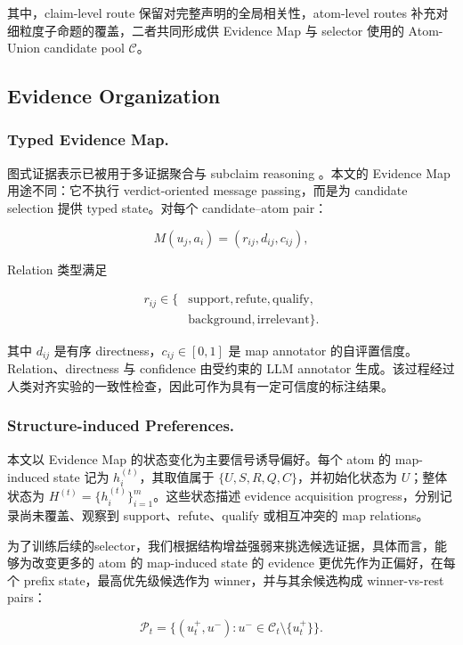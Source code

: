 \documentclass[letterpaper]{article}
\begin{document}
其中，claim-level route 保留对完整声明的全局相关性，atom-level routes 补充对细粒度子命题的覆盖，二者共同形成供 Evidence Map 与 selector 使用的 Atom-Union candidate pool $\mathcal C$。

\subsection{Evidence Organization}

\subsubsection{Typed Evidence Map.}

图式证据表示已被用于多证据聚合与 subclaim reasoning \citep{Zhou2019GEAR,Liu2019KGAT,Wang2026GDefense,Lourenco2026KGCRAFT}。本文的 Evidence Map 用途不同：它不执行 verdict-oriented message passing，而是为 candidate selection 提供 typed state。对每个 candidate--atom pair：

\[
M(u_j,a_i)=(r_{ij},d_{ij},c_{ij}),
\]

Relation 类型满足

\[
\begin{aligned}
r_{ij}\in\{&\text{support},\text{refute},\text{qualify},\\
             &\text{background},\text{irrelevant}\}.
\end{aligned}
\]

其中 $d_{ij}$ 是有序 directness，$c_{ij}\in[0,1]$ 是 map annotator 的自评置信度。Relation、directness 与 confidence 由受约束的 LLM annotator 生成。该过程经过人类对齐实验的一致性检查，因此可作为具有一定可信度的标注结果。

\subsubsection{Structure-induced Preferences.}

本文以 Evidence Map 的状态变化为主要信号诱导偏好。每个 atom 的 map-induced state 记为 $h_i^{(t)}$，其取值属于 $\{U,S,R,Q,C\}$，并初始化状态为 $U$；整体状态为 $H^{(t)}=\{h_i^{(t)}\}_{i=1}^{m}$。这些状态描述 evidence acquisition progress，分别记录尚未覆盖、观察到 support、refute、qualify 或相互冲突的 map relations。

为了训练后续的selector，我们根据结构增益强弱来挑选候选证据，具体而言，能够为改变更多的 atom 的 map-induced state 的 evidence 更优先作为正偏好，在每个 prefix state，最高优先级候选作为 winner，并与其余候选构成 winner-vs-rest pairs：

\[
\mathcal P_t=\{(u_t^+,u^-):u^-\in\mathcal C_t\setminus\{u_t^+\}\}.
\]
\end{document}
